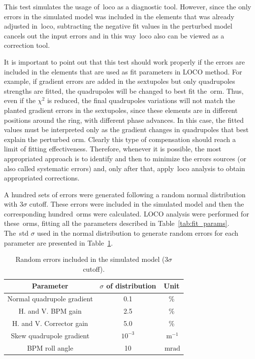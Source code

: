 This test simulates the usage of~\gls{loco} as a diagnostic tool. However, since the only errors in the simulated model was included in the elements that was already adjusted in~\gls{loco}, subtracting the negative fit values in the perturbed model cancels out the input errors and in this way~\gls{loco} also can be viewed as a correction tool.

It is important to point out that this test should work properly if the errors are included in the elements that are used as fit parameters in LOCO method. For example, if gradient errors are added in the sextupoles but only quadrupoles strengths are fitted, the quadrupoles will be changed to best fit the~\gls{orm}. Thus, even if the $\chi^2$ is reduced, the final quadrupoles variations will not match the planted gradient errors in the sextupoles, since these elements are in different positions around the ring, with different phase advances. In this case, the fitted values must be interpreted only as the gradient changes in quadrupoles that best explain the perturbed \gls{orm}. Clearly this type of compensation should reach a limit of fitting effectiveness. Therefore, whenever it is possible, the most appropriated approach is to identify and then to minimize the errors sources (or also called systematic errors) and, only after that, apply~\gls{loco} analysis to obtain appropriated corrections.

A hundred sets of errors were generated following a random normal distribution with $3\sigma$ cutoff. These errors were included in the simulated model and then the corresponding hundred~\gls{orm}s were calculated. LOCO analysis were performed for these~\gls{orm}s, fitting all the parameters described in Table~\ref{tab:fit_params}. The~\gls{std} $\sigma$ used in the normal distribution to generate random errors for each parameter are presented in Table~\ref{tab:errors}.
\begin{table}[h!]
    \centering
    \caption{Random errors included in the simulated model ($3\sigma$ cutoff).}
    \label{tab:errors}
    \begin{tabular}{ccc}
        \toprule\toprule
        Parameter & $\sigma$ of distribution & Unit\\ 
        \hline
        Normal quadrupole gradient & 0.1 &\% \\
        H. and V. BPM gain &  2.5 & \% \\
        H. and V. Corrector gain & 5.0 &\% \\
        Skew quadrupole gradient & $10^{-3}$ &$\SI{}{\meter^{-1}}$ \\
        BPM roll angle & 10 & $\SI{}{\milli\radian}$ \\ 
        \bottomrule\bottomrule
    \end{tabular}
\end{table}

